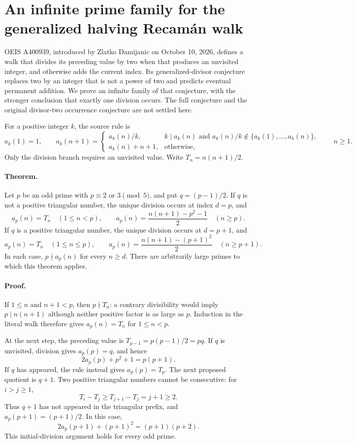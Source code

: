 \section{An infinite prime family for the generalized halving Recam\'an walk}
\label{sec:prime-division-recaman}

OEIS A400939, introduced by Zlatko Damijanic on October 10, 2026,
defines a walk that divides its preceding value by two when that produces
an unvisited integer, and otherwise adds the current index. Its
generalized-divisor conjecture replaces two by an integer that is not a
power of two and predicts eventual permanent addition. We prove an
infinite family of that conjecture, with the stronger conclusion that
exactly one division occurs. The full conjecture and the original
divisor-two occurrence conjecture are not settled here.

For a positive integer $k$, the source rule is
\[
 a_k(1)=1,\qquad
 a_k(n+1)=
 \begin{cases}
  a_k(n)/k,& k\mid a_k(n)\text{ and }
       a_k(n)/k\notin\{a_k(1),\ldots,a_k(n)\},\\
  a_k(n)+n+1,&\text{otherwise},
 \end{cases}
 \qquad n\ge1.
\]
Only the division branch requires an unvisited value. Write
$T_n=n(n+1)/2$.

\paragraph{Theorem.}
Let $p$ be an odd prime with $p\equiv2$ or $3\pmod5$, and put
$q=(p-1)/2$. If $q$ is not a positive triangular number, the unique
division occurs at index $d=p$, and
\[
 a_p(n)=T_n\quad(1\le n<p),\qquad
 a_p(n)=\frac{n(n+1)-p^2-1}{2}\quad(n\ge p).
\]
If $q$ is a positive triangular number, the unique division occurs at
$d=p+1$, and
\[
 a_p(n)=T_n\quad(1\le n\le p),\qquad
 a_p(n)=\frac{n(n+1)-(p+1)^2}{2}\quad(n\ge p+1).
\]
In each case, $p\nmid a_p(n)$ for every $n\ge d$. There are arbitrarily
large primes to which this theorem applies.

\paragraph{Proof.}
If $1\le n$ and $n+1<p$, then $p\nmid T_n$: a contrary divisibility
would imply $p\mid n(n+1)$ although neither positive factor is as large
as $p$. Induction in the literal walk therefore gives
$a_p(n)=T_n$ for $1\le n<p$.

At the next step, the preceding value is
$T_{p-1}=p(p-1)/2=pq$. If $q$ is unvisited, division gives
$a_p(p)=q$, and hence
\[
 2a_p(p)+p^2+1=p(p+1).
\]
If $q$ has appeared, the rule instead gives $a_p(p)=T_p$. The next
proposed quotient is $q+1$. Two positive triangular numbers cannot be
consecutive: for $i>j\ge1$,
\[
 T_i-T_j\ge T_{j+1}-T_j=j+1\ge2.
\]
Thus $q+1$ has not appeared in the triangular prefix, and
$a_p(p+1)=(p+1)/2$. In this case,
\[
 2a_p(p+1)+(p+1)^2=(p+1)(p+2).
\]
This initial-division argument holds for every odd prime.

